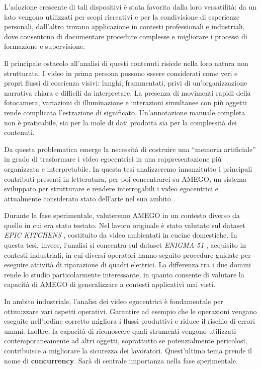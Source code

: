 L'adozione crescente di tali dispositivi è stata favorita dalla loro versatilità: da un lato vengono utilizzati per scopi ricreativi e per la condivisione di esperienze personali, dall'altro trovano applicazione in contesti professionali e industriali, dove consentono di documentare procedure complesse e migliorare i processi di formazione e supervisione.

Il principale ostacolo all'analisi di questi contenuti risiede nella loro natura non strutturata. I video in prima persona possono essere considerati come veri e propri flussi di coscienza visivi: lunghi, frammentati, privi di un'organizzazione narrativa chiara e difficili da interpretare. La presenza di movimenti rapidi della fotocamera, variazioni di illuminazione e interazioni simultanee con più oggetti rende complicata l'estrazione di significato. Un'annotazione manuale completa non è praticabile, sia per la mole di dati prodotta sia per la complessità dei contenuti.

Da questa problematica emerge la necessità di costruire una “memoria artificiale” in grado di trasformare i video egocentrici in una rappresentazione più organizzata e interpretabile. In questa tesi analizzeremo innanzitutto i principali contributi presenti in letteratura, per poi concentrarci su \textsc{AMEGO}\cite{goletto2024amego}, un sistema sviluppato per strutturare e rendere interrogabili i video egocentrici e attualmente considerato stato dell'arte nel suo ambito \cite{goletto2024amego}.

Durante la fase sperimentale, valuteremo \textsc{AMEGO} in un contesto diverso da quello in cui era stato testato. Nel lavoro originale è stato valutato sul dataset \emph{EPIC KITCHENS} \cite{Damen2021PAMI}, costituito da video ambientati in cucine domestiche. In questa tesi, invece, l'analisi si concentra sul dataset \emph{ENIGMA-51} \cite{ragusa2023enigma51}, acquisito in contesti industriali, in cui diversi operatori hanno seguito procedure guidate per eseguire attività di riparazione di quadri elettrici. La differenza tra i due domini rende lo studio particolarmente interessante, in quanto consente di valutare la capacità di AMEGO di generalizzare a contesti applicativi mai visti.

In ambito industriale, l'analisi dei video egocentrici è fondamentale per ottimizzare vari aspetti operativi. Garantire ad esempio che le operazioni vengano eseguite nell'ordine corretto migliora i flussi produttivi e riduce il rischio di errori umani. Inoltre, la capacità di riconoscere quali strumenti vengono utilizzati contemporaneamente ad altri oggetti, soprattutto se potenzialmente pericolosi, contribuisce a migliorare la sicurezza dei lavoratori. Quest'ultimo tema prende il nome di \textbf{concurrency}. Sarà di centrale importanza nella fase sperimentale.